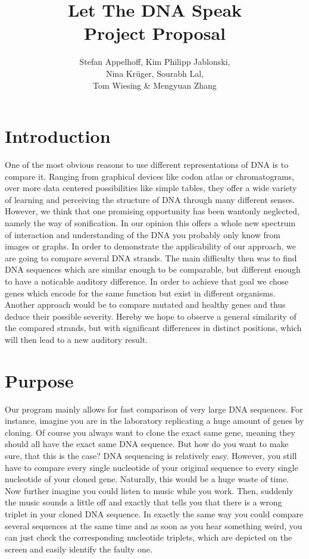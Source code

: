 \documentclass[12pt]{article}
\title{Let The DNA Speak\\Project Proposal}
\author{Stefan Appelhoff, Kim Philipp Jablonski, \\Nina Krüger, Sourabh Lal, \\Tom Wiesing \& Mengyuan Zhang}
\begin{document}
\maketitle

\tableofcontents

\section{Introduction}

One of the most obvious reasons to use different representations of DNA is to compare it. Ranging from graphical devices like codon atlas or chromatograms, over more data centered possibilities like simple tables, they offer a wide variety of learning and perceiving the structure of DNA through many different senses.
However, we think that one promising opportunity has been wantonly neglected, namely the way of sonification. In our opinion this offers a whole new spectrum of interaction and understanding of the DNA you probably only know from images or graphs.
In order to demonstrate the applicability of our approach, we are going to compare several DNA strands. The main difficulty then was to find DNA sequences which are similar enough to be comparable, but different enough to have a noticable auditory difference.
In order to achieve that goal we chose genes which encode for the same function but exist in different organisms. Another approach would be to compare mutated and healthy genes and thus deduce their possible severity. Hereby we hope to observe a general similarity of the compared strands, but with significant differences in distinct positions, which will then lead to a new auditory result.

\section{Purpose}

Our program mainly allows for fast comparison of very large DNA sequences. For instance, imagine you are in the laboratory replicating a huge amount of genes by cloning. Of course you always want to clone the exact same gene, meaning they should all have the exact same DNA sequence. But how do you want to make sure, that this is the case?
DNA sequencing is relatively easy. However, you still have to compare every single nucleotide of your original sequence to every single nucleotide of your cloned gene. Naturally, this would be a huge waste of time.
Now further imagine you could listen to music while you work. Then, suddenly the music sounds a little off and exactly that tells you that there is a wrong triplet in your cloned DNA sequence. In exactly the same way you could compare several sequences at the same time and as soon as you hear something weird, you can just check the corresponding nucleotide triplets, which are depicted on the screen and easily identify the faulty one. 
\end{document}
